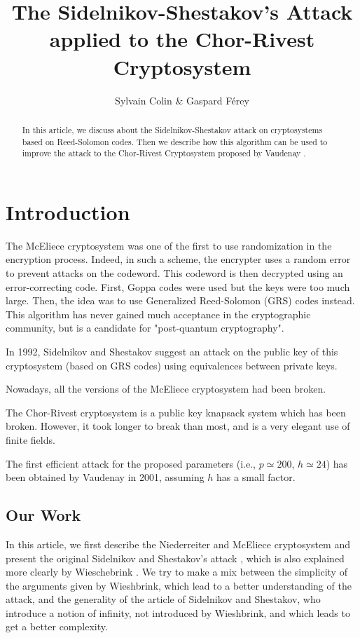 \documentclass[a4paper]{article}
\author{Sylvain Colin \& Gaspard Férey}
\title{The Sidelnikov-Shestakov's Attack applied to the Chor-Rivest Cryptosystem}
\begin{document}
\maketitle

\begin{abstract}

In this article, we discuss about the Sidelnikov-Shestakov attack on cryptosystems based on Reed-Solomon codes. Then we describe how this algorithm can be used to improve the attack to the Chor-Rivest Cryptosystem proposed by Vaudenay \cite{Vau01}.

\end{abstract}

\section{Introduction}
\label{sec:intro}

The McEliece cryptosystem \cite{NiederH86} was one of the first to use randomization in the encryption process. Indeed, in such a scheme, the encrypter uses a random error to prevent attacks on the codeword. This codeword is then decrypted using an error-correcting code. 
First, Goppa codes were used but the keys were too much large. Then, the idea was to use Generalized Reed-Solomon (GRS) codes instead.
This algorithm has never gained much acceptance in the cryptographic community, but is a candidate for "post-quantum cryptography".

In 1992, Sidelnikov and Shestakov suggest an attack \cite{SidelShes92} on the public key of this cryptosystem (based on GRS codes) using equivalences between private keys.

Nowadays, all the versions of the McEliece cryptosystem had been broken.

The Chor-Rivest cryptosystem \cite{ChorRiv88} is a public key knapsack system which has been broken.  However, it took longer to break than most, and is a very elegant use of finite fields.

The first efficient attack for the proposed parameters (i.e., $p \simeq 200$, $h \simeq 24$) has been obtained by Vaudenay in 2001, assuming $h$ has a small factor.


\subsection{Our Work}
In this article, we first describe the Niederreiter and McEliece cryptosystem and present the original Sidelnikov and Shestakov's attack \cite{SidelShes92}, which is also explained more clearly by Wieschebrink \cite{Wiesch}.
We try to make a mix between the simplicity of the arguments given by Wieshbrink, which lead to a better understanding of the attack, and the generality of the article of Sidelnikov and Shestakov, who introduce a notion of infinity,
not introduced by Wieshbrink, and which leads to get a better complexity.
\end{document}
